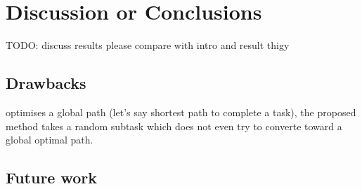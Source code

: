 \chapter{Discussion or Conclusions}

TODO: discuss results
please compare with intro and result thigy

\section{Drawbacks}
\cite{goldberg_asymptotically_2020} optimises a global path (let's say shortest path to complete a task), the proposed method takes a random subtask which does not even try to converte toward a global optimal path. 

\section{Future work}

